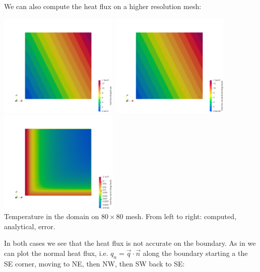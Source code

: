 We can also compute the heat flux on a higher resolution mesh:
\begin{center}
\includegraphics[width=5.7cm]{python_codes/fieldstone_173/results/exp1/q80}
\includegraphics[width=5.7cm]{python_codes/fieldstone_173/results/exp1/q80_analytical}
\includegraphics[width=5.7cm]{python_codes/fieldstone_173/results/exp1/q80_error}\\
{\captionfont Temperature in the domain on $80 \times 80$ mesh. From left to right:
computed, analytical, error.}
\end{center}

In both cases we see that the heat flux is not accurate on the boundary.
As in \textcite{grls87} we can plot the normal heat flux, i.e. $q_n=\vec{q}\cdot \vec{n}$
along the boundary starting a the SE corner, moving to NE, then NW, then SW back to SE:

